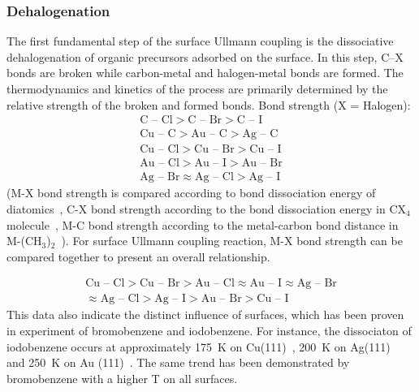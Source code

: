 \documentclass[%
 reprint,
 amsmath,amssymb,
 aps,
prb,
]{revtex4-2}
\begin{document}
\subsubsection{\label{sec:level3}Dehalogenation}

The first fundamental step of the surface Ullmann coupling is the dissociative dehalogenation of organic precursors adsorbed on the surface. In this step, C--X bonds are broken while carbon-metal and halogen-metal bonds are formed. The thermodynamics and kinetics of the process are primarily determined by the relative strength of the broken and formed bonds. 
Bond strength (X = Halogen):
%
\begin{eqnarray}
\text{C -- Cl} > \text{C -- Br} > \text{C -- I} \\ 
\text{Cu -- C} > \text{Au -- C} > \text{Ag -- C} \\
\text{Cu -- Cl} > \text{Cu -- Br} > \text{Cu -- I}\\
\text{Au -- Cl} > \text{Au -- I} > \text{Au -- Br} \\
\text{Ag -- Br} \approx \text{Ag -- Cl} > \text{Ag -- I} 
\end{eqnarray}
(M-X bond strength is compared according to bond dissociation energy of diatomics~\cite{ullmann_62}, C-X bond strength according to the bond dissociation energy in CX$_4$ molecule~\cite{ullmann_63}, M-C bond strength according to the metal-carbon bond distance in M-(CH$_3$)$_2$~\cite{ullmann_61}).
For surface Ullmann coupling reaction, M-X bond strength can be compared together to present an overall relationship.

\begin{gather*}
\text{Cu -- Cl} > \text{Cu -- Br} > \text{Au -- Cl} \approx \text{Au -- I} \approx \text{Ag -- Br}\\
 \approx \text{Ag -- Cl} > \text{Ag -- I} > \text{Au -- Br} > \text{Cu -- I}
\end{gather*}
%
This data also indicate the distinct influence of surfaces, which has been proven in experiment of bromobenzene and iodobenzene. For instance, the dissociaton of iodobenzene occurs at approximately 175~K on Cu(111)~\cite{sur_sci01}, 200~K on Ag(111)~\cite{sur_sci02} and 250~K on Au (111)~\cite{sur_sci03}. The same trend has been demonstrated by bromobenzene with a higher T on all surfaces.
\end{document}
